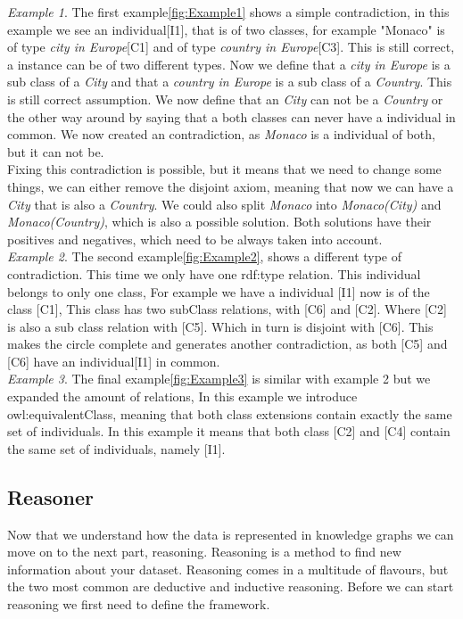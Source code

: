 \documentclass{article}
\begin{document}
\textit{Example 1}. The first example\ref{fig:Example1} shows a simple contradiction, in this example we see an individual[I1], that is of two classes, for example "Monaco" is of type \textit{city in Europe}[C1] and of type \textit{country in Europe}[C3]. This is still correct, a instance can be of two different types. Now we define that a \textit{city in Europe} is a sub class of a \textit{City} and that a \textit{country in Europe} is a sub class of a \textit{Country}. This is still correct assumption. We now define that an \textit{City} can not be a \textit{Country} or the other way around by saying that a both classes can never have a individual in common. We now created an contradiction, as \textit{Monaco} is a individual of both, but it can not be.\\
Fixing this contradiction is possible, but it means that we need to change some things, we can either remove the disjoint axiom, meaning that now we can have a \textit{City} that is also a \textit{Country}. We could also split \textit{Monaco} into \textit{Monaco(City)} and \textit{Monaco(Country)}, which is also a possible solution. Both solutions have their positives and negatives, which need to be always taken into account.\\

\textit{Example 2}. The second example\ref{fig:Example2}, shows a different type of contradiction. This time we only have one rdf:type relation. This individual belongs to only one class, For example we have a individual \textit{}[I1] now is of the class \textit{ }[C1], This class has two subClass relations, with \textit{ }[C6] and \textit{ }[C2]. Where \textit{ }[C2] is also a sub class relation with \textit{ }[C5]. Which in turn is disjoint with \textit{ }[C6]. This makes the circle complete and generates another contradiction, as both \textit{ }[C5] and \textit{ }[C6] have an individual[I1] in common. \\

\textit{Example 3}. The final example\ref{fig:Example3} is similar with example 2 but we expanded the amount of relations, In this example we introduce owl:equivalentClass, meaning that both class extensions contain exactly the same set of individuals. In this example it means that both class \textit{}[C2] 
and \textit{}[C4] contain the same set of individuals, namely \textit{}[I1]. \\

\subsection{Reasoner}
Now that we understand how the data is represented in knowledge graphs we can move on to the next part, reasoning. Reasoning is a method to find new information about your dataset. Reasoning comes in a multitude of flavours, but the two most common are deductive and inductive reasoning. Before we can start reasoning we first need to define the framework.
\end{document}
